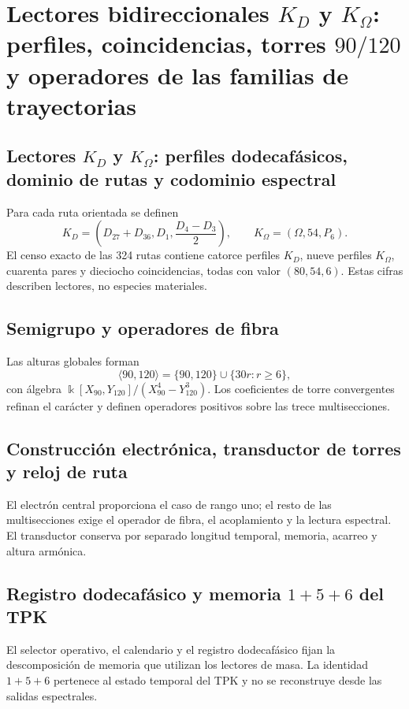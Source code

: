 \chapter{Lectores bidireccionales \texorpdfstring{\(K_D\)}{K(D)} y \texorpdfstring{\(K_\Omega\)}{K(Omega)}: perfiles, coincidencias, torres \texorpdfstring{\(90/120\)}{90/120} y operadores de las familias de trayectorias}
\label{chap:lectores-bidireccionales-torres-operadores}

\section{Lectores \(K_D\) y \(K_\Omega\): perfiles dodecafásicos, dominio de rutas y codominio espectral}
Para cada ruta orientada se definen
\[
 K_D=\left(D_{27}+D_{36},D_1,\frac{D_4-D_3}{2}\right),
 \qquad K_\Omega=(\Omega,54,P_6).
\]
El censo exacto de las 324 rutas contiene catorce perfiles \(K_D\), nueve
perfiles \(K_\Omega\), cuarenta pares y dieciocho coincidencias, todas con
valor \((80,54,6)\). Estas cifras describen lectores, no especies materiales.

\section{Semigrupo y operadores de fibra}
Las alturas globales forman
\[
 \langle90,120\rangle=\{90,120\}\cup\{30r:r\ge6\},
\]
con álgebra \(\Bbbk[X_{90},Y_{120}]/(X_{90}^4-Y_{120}^3)\). Los coeficientes
de torre convergentes refinan el carácter y definen operadores positivos sobre
las trece multisecciones.

\section{Construcción electrónica, transductor de torres y reloj de ruta}
El electrón central proporciona el caso de rango uno; el resto de las
multisecciones exige el operador de fibra, el acoplamiento y la lectura
espectral. El transductor conserva por separado longitud temporal, memoria,
acarreo y altura armónica.

\section{Registro dodecafásico y memoria \texorpdfstring{\(1+5+6\)}{1+5+6} del TPK}

El selector operativo, el calendario y el registro dodecafásico fijan la
descomposición de memoria que utilizan los lectores de masa. La identidad
\(1+5+6\) pertenece al estado temporal del TPK y no se reconstruye desde las
salidas espectrales.

